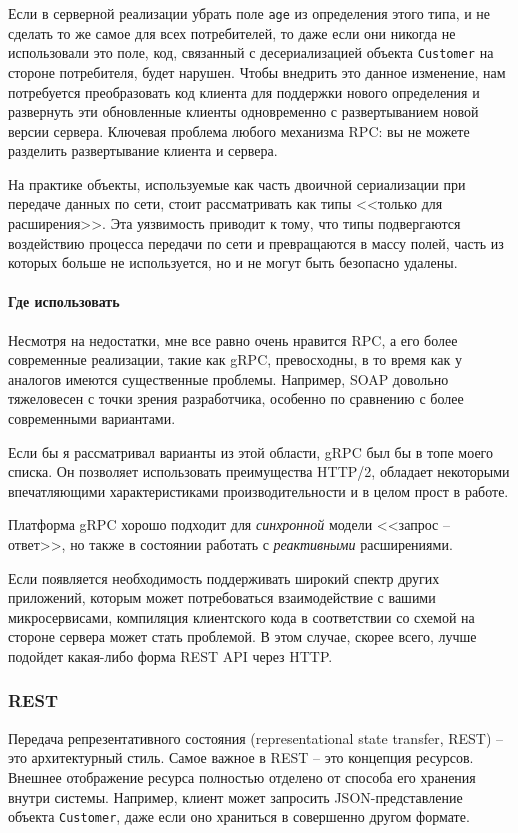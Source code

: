\documentclass[%
	11pt,
	a4paper,
	utf8,
		]{article}
\begin{document}
Если в серверной реализации убрать поле \verb|age| из определения этого типа, и не сделать то же самое для всех потребителей, то даже если они никогда не использовали это поле, код, связанный с десериализацией объекта \verb|Customer| на стороне потребителя, будет нарушен. Чтобы внедрить это данное изменение, нам потребуется преобразовать код клиента для поддержки нового определения и развернуть эти обновленные клиенты одновременно с развертыванием новой версии сервера. Ключевая проблема любого механизма RPC: вы не можете разделить развертывание клиента и сервера.

На практике объекты, используемые как часть двоичной сериализации при передаче данных по сети, стоит рассматривать как типы <<только для расширения>>. Эта уязвимость приводит к тому, что типы подвергаются воздействию процесса передачи по сети и превращаются в массу полей, часть из которых больше не используется, но и не могут быть безопасно удалены.

\paragraph{Где использовать} Несмотря на недостатки, мне все равно очень нравится RPC, а его более современные реализации, такие как gRPC, превосходны, в то время как у аналогов имеются существенные проблемы. Например, SOAP довольно тяжеловесен с точки зрения разработчика, особенно по сравнению с более современными вариантами.

Если бы я рассматривал варианты из этой области, gRPC был бы в топе моего списка. Он позволяет использовать преимущества HTTP/2, обладает некоторыми впечатляющими характеристиками производительности и в целом прост в работе.

Платформа gRPC хорошо подходит для \emph{синхронной} модели <<запрос -- ответ>>, но также в состоянии работать с \emph{реактивными} расширениями.

Если появляется необходимость поддерживать широкий спектр других приложений, которым может потребоваться взаимодействие с вашими микросервисами, компиляция клиентского кода в соответствии со схемой на стороне сервера может стать проблемой. В этом случае, скорее всего, лучше подойдет какая-либо форма REST API через HTTP.

\subsubsection{REST}

Передача репрезентативного состояния (representational state transfer, REST) -- это архитектурный стиль. Самое важное в REST -- это концепция ресурсов. Внешнее отображение ресурса полностью отделено от способа его хранения внутри системы. Например, клиент может запросить JSON-представление объекта \verb|Customer|, даже если оно храниться в совершенно другом формате.
\end{document}
